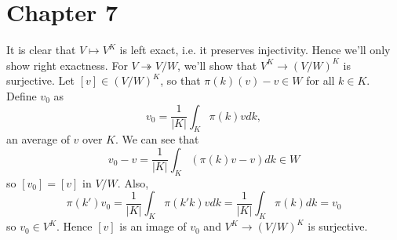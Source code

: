 \newpage
\section{Chapter 7}

\begin{problem} \notfinish
\end{problem}

\begin{problem} \notfinish
\end{problem}

\begin{problem} \notfinish
\end{problem}


\begin{problem} \notfinish
\end{problem}


\begin{problem}
It is clear that $V\mapsto V^K$ is left exact, i.e. it preserves injectivity.
Hence we'll only show right exactness.
For $V \twoheadrightarrow V/W$, we'll show that $V^K \to (V/W)^K$ is surjective.
Let $[v] \in (V/W)^K$, so that $\pi(k)(v) - v \in W$ for all $k \in K$.
Define $v_0$ as
$$
v_0 = \frac{1}{|K|}\int_K \pi(k)vdk,
$$
an average of $v$ over $K$. We can see that
$$
v_0 - v = \frac{1}{|K|} \int_{K} (\pi(k)v - v)dk \in W
$$
so $[v_0] = [v]$ in $V/W$. Also,
$$
\pi(k')v_0 = \frac{1}{|K|} \int_{K}\pi(k'k)vdk = \frac{1}{|K|}\int_K \pi(k)dk = v_0
$$
so $v_0 \in V^{K}$. Hence $[v]$ is an image of $v_0$ and $V^{K} \to (V/W)^{K}$ is surjective.
\end{problem}


\begin{problem} \notfinish
\end{problem}


\begin{problem} \notfinish
\end{problem}
